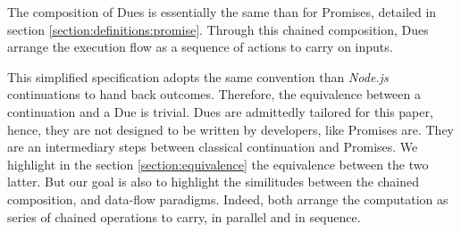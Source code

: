 The composition of Dues is essentially the same than for Promises, detailed in section \ref{section:definitions:promise}.
Through this chained composition, Dues arrange the execution flow as a sequence of actions to carry on inputs.




This simplified specification adopts the same convention than \textit{Node.js} continuations to hand back outcomes.
Therefore, the equivalence between a continuation and a Due is trivial.
Dues are admittedly tailored for this paper, hence, they are not designed to be written by developers, like Promises are.
They are an intermediary steps between classical continuation and Promises.
We highlight in the section \ref{section:equivalence} the equivalence between the two latter.
But our goal is also to highlight the similitudes between the chained composition, and data-flow paradigms.
Indeed, both arrange the computation as series of chained operations to carry, in parallel and in sequence.


